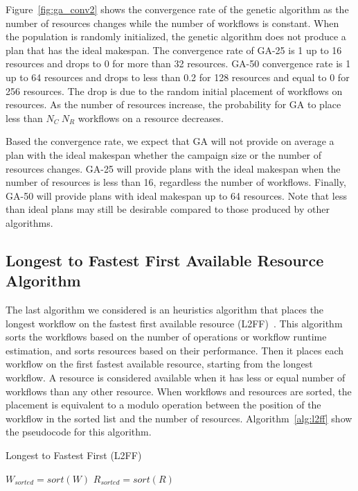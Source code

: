 Figure~\ref{fig:ga_conv2} shows the convergence rate of the genetic algorithm as
the number of resources changes while the number of workflows is constant. When
the population is randomly initialized, the genetic algorithm does not produce a
plan that has the ideal makespan. The convergence rate of GA-25 is 1 up to 16
resources and drops to 0 for more than 32 resources. GA-50 convergence rate is 1
up to 64 resources and drops to less than 0.2 for 128 resources and equal to 0
for 256 resources. The drop is due to the random initial placement of workflows
on resources. As the number of resources increase, the probability for GA to
place less than $N_{C} \ N_{R}$ workflows on a resource decreases.

Based the convergence rate, we expect that GA will not provide on average a plan
with the ideal makespan whether the campaign size or the number of resources
changes. GA-25 will provide plans with the ideal makespan when the number of
resources is less than 16, regardless the number of workflows. Finally, GA-50
will provide plans with ideal makespan up to 64 resources. Note that less than
ideal plans may still be desirable compared to those produced by other
algorithms.

\subsection{Longest to Fastest First Available Resource Algorithm}
\label{algo:l2ff}

The last algorithm we considered is an heuristics algorithm that places the
longest workflow on the fastest first available resource
(L2FF)~\cite{balasubramanian2019programming}. This algorithm sorts the workflows
based on the number of operations or workflow runtime estimation, and sorts
resources based on their performance. Then it places each workflow on the first
fastest available resource, starting from the longest workflow. A resource is
considered available when it has less or equal number of workflows than any
other resource. When workflows and resources are sorted, the placement is
equivalent to a modulo operation between the position of the workflow in the
sorted list and the number of resources. Algorithm~\ref{alg:l2ff} show the
pseudocode for this algorithm.

\begin{algorithm}[ht]
    \caption{Longest to Fastest First (L2FF)}
    \label{alg:l2ff}
    \begin{algorithmic}[1]
        \State \texttt{$W_{sorted}=sort(W)$}
        \State \texttt{$R_{sorted}=sort(R)$}
        \EndFor
        \EndProcedure
    \end{algorithmic}
\end{algorithm}

